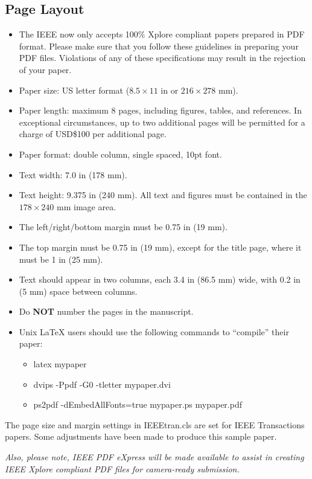 \documentclass[conference]{IEEEtran}
\begin{document}
\subsection{Page Layout}
\begin{itemize}
\item The IEEE now only accepts 100$\%$ Xplore compliant papers prepared
in PDF format.  Please make sure that you follow these guidelines in
preparing your PDF files.  Violations of any of these specifications
may result in the rejection of your paper.
\item Paper size: US letter format ($8.5\times 11$ in or $216\times
278$ mm).
\item Paper length: maximum 8 pages, including figures, tables, and
references.  In exceptional circumstances, up to two additional pages
will be permitted for a charge of USD\$100 per additional page.
\item Paper format: double column, single spaced, 10pt font.
\item Text width: 7.0 in (178 mm).
\item Text height: 9.375 in (240 mm).
All text and figures must be contained in the $178 \times 240$ mm
image area.
\item The left/right/bottom margin must be 0.75 in (19 mm).
\item The top margin must be 0.75 in (19 mm), except for the title page,
where it must be 1 in (25 mm).
\item Text should appear in two columns, each 3.4 in (86.5 mm) wide, with
0.2 in (5 mm) space between columns.
\item Do {\bf NOT} number the pages in the manuscript.
\item Unix LaTeX users should use the following commands to ``compile''
their paper:
    \begin{itemize}
    \item latex mypaper
    \item dvips -Ppdf -G0 -tletter mypaper.dvi
    \item ps2pdf -dEmbedAllFonts=true mypaper.ps mypaper.pdf
    \end{itemize}
\end{itemize}

The page size and margin settings in IEEEtran.cls are set for IEEE
Transactions papers.  Some adjustments have been made to produce this
sample paper.

{\it Also, please note, IEEE PDF eXpress will be made available to assist
in creating IEEE Xplore compliant PDF files for camera-ready submission.}
\end{document}
